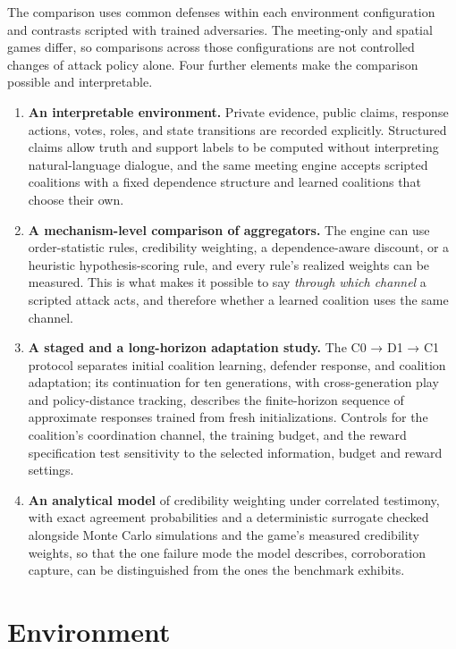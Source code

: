 \documentclass[
  12pt,
]{article}
\providecommand{\tightlist}{%
  \setlength{\itemsep}{0pt}\setlength{\parskip}{0pt}}
\begin{document}
The comparison uses common defenses within each environment
configuration and contrasts scripted with trained adversaries. The
meeting-only and spatial games differ, so comparisons across those
configurations are not controlled changes of attack policy alone. Four
further elements make the comparison possible and interpretable.

\begin{enumerate}
\def\labelenumi{\arabic{enumi}.}
\tightlist
\item
  \textbf{An interpretable environment.} Private evidence, public
  claims, response actions, votes, roles, and state transitions are
  recorded explicitly. Structured claims allow truth and support labels
  to be computed without interpreting natural-language dialogue, and the
  same meeting engine accepts scripted coalitions with a fixed
  dependence structure and learned coalitions that choose their own.
\item
  \textbf{A mechanism-level comparison of aggregators.} The engine can
  use order-statistic rules, credibility weighting, a dependence-aware
  discount, or a heuristic hypothesis-scoring rule, and every rule's
  realized weights can be measured. This is what makes it possible to
  say \emph{through which channel} a scripted attack acts, and therefore
  whether a learned coalition uses the same channel.
\item
  \textbf{A staged and a long-horizon adaptation study.} The C0 → D1 →
  C1 protocol separates initial coalition learning, defender response,
  and coalition adaptation; its continuation for ten generations, with
  cross-generation play and policy-distance tracking, describes the
  finite-horizon sequence of approximate responses trained from fresh
  initializations. Controls for the coalition's coordination channel,
  the training budget, and the reward specification test sensitivity to
  the selected information, budget and reward settings.
\item
  \textbf{An analytical model} of credibility weighting under correlated
  testimony, with exact agreement probabilities and a deterministic
  surrogate checked alongside Monte Carlo simulations and the game's
  measured credibility weights, so that the one failure mode the model
  describes, corroboration capture, can be distinguished from the ones
  the benchmark exhibits.
\end{enumerate}

\FloatBarrier

\section{Environment}\label{environment}
\end{document}
